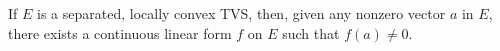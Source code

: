 If $E$ is a separated, locally convex TVS, then, given any nonzero vector $a$ in $E$, there exists a continuous linear form $f$ on $E$ such that $f(a) \neq 0$.
